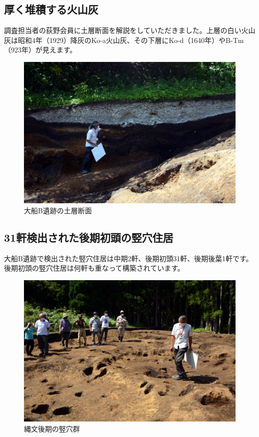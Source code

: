 \documentclass[a4j,11pt,twocolumn,openany]{jsbook}
\begin{document}
\subsection{厚く堆積する火山灰}

調査担当者の荻野会員に土層断面を解説をしていただきました。上層の白い火山灰は昭和4年（1929）降灰のKo-a火山灰、その下層にKo-d（1640年）やB-Tm（923年）が見えます。

\begin{figure}[ht]
	\centering
	\includegraphics[width=\linewidth]{fig/01_Iseki_kengaku/10_OfuneB_section.JPG}
	\caption{大船B遺跡の土層断面}
	\label{}
\end{figure}

\subsection{31軒検出された後期初頭の竪穴住居}

大船B遺跡で検出された竪穴住居は中期2軒、後期初頭31軒、後期後葉1軒です。後期初頭の竪穴住居は何軒も重なって構築されています。

\begin{figure}[ht]
	\centering
	\includegraphics[width=\linewidth]{fig/01_Iseki_kengaku/11_Ofune_house.JPG}
	\caption{縄文後期の竪穴群}
	\label{}
\end{figure}
\end{document}
